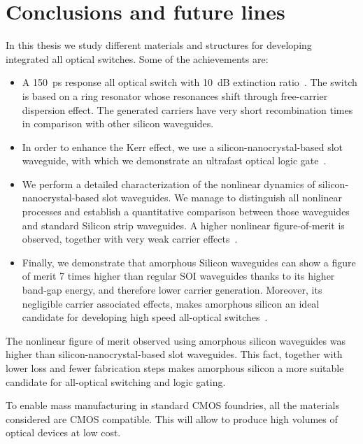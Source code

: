 \pagestyle{fancy}
\lhead{}
\renewcommand{\chaptermark}[1]{\markboth{\thechapter.\ #1}{}}
\chapter{Conclusions and future lines}
\label{ch:conclusions}

In this thesis we study different materials and structures for developing integrated all optical switches. Some of the achievements are:

\begin{itemize}
 \item A 150~ps response all optical switch with 10~dB extinction ratio~\cite{optoel}. The switch is based on a ring resonator whose resonances shift through free-carrier dispersion effect. The generated carriers have very short recombination times in comparison with other silicon waveguides.
 
 \item In order to enhance the Kerr effect, we use a silicon-nanocrystal-based slot waveguide, with which we demonstrate an ultrafast optical logic gate~\cite{Oton2010}.
 
 \item We perform a detailed characterization of the nonlinear dynamics of silicon-nanocrystal-based slot waveguides. We manage to distinguish all nonlinear processes and establish a quantitative comparison between those waveguides and standard Silicon strip waveguides. A higher nonlinear figure-of-merit is observed, together with very weak carrier effects~\cite{Matres2011,Matres:12}.
 
  \item Finally, we demonstrate that amorphous Silicon waveguides can show a figure of merit 7 times higher than regular SOI waveguides thanks to its higher band-gap energy, and therefore lower carrier generation. Moreover, its negligible carrier associated effects, makes amorphous silicon an ideal candidate for developing high speed all-optical switches~\cite{Matres2013}.
  
 \end{itemize}
 
 
The nonlinear figure of merit observed using amorphous silicon waveguides was higher than silicon-nanocrystal-based slot waveguides. This fact, together with lower loss and fewer fabrication steps makes amorphous silicon a more suitable candidate for all-optical switching and logic gating.
 

To enable mass manufacturing in standard CMOS foundries, all the materials considered are CMOS compatible. This will allow to produce high volumes of optical devices at low cost.

